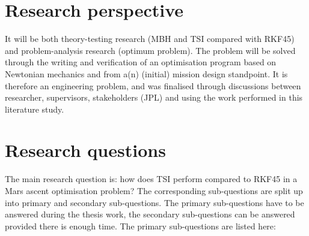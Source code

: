 


\section{Research perspective}
\label{sec:respers_fin}
It will be both theory-testing research (\ac{MBH} and \ac{TSI} compared with \ac{RKF45}) and problem-analysis research (optimum problem). The problem will be solved through the writing and verification of an optimisation program based on Newtonian mechanics and from a(n) (initial) mission design standpoint. It is therefore an engineering problem, and was finalised through discussions between researcher, supervisors, stakeholders (\ac{JPL}) and using the work performed in this literature study. 



\section{Research questions}
\label{sec:resques_fin}
The main research question is: how does \ac{TSI} perform compared to \ac{RKF45} in a Mars ascent optimisation problem? The corresponding sub-questions are split up into primary and secondary sub-questions. The primary sub-questions have to be answered during the thesis work, the secondary sub-questions can be answered provided there is enough time. The primary sub-questions are listed here:\\

